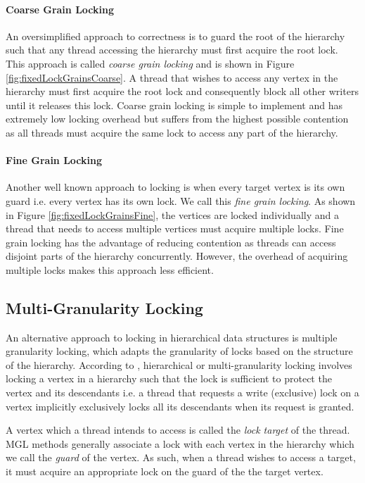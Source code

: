 \paragraph{Coarse Grain Locking}
An oversimplified approach to correctness is to guard the root of the hierarchy such that any thread accessing the hierarchy must first acquire the root lock.
This approach is called \emph{coarse grain locking} and is shown in Figure \ref{fig:fixedLockGrainsCoarse}.
A thread that wishes to access any vertex in the hierarchy must first acquire the root lock and consequently block all other writers until it releases this lock. 
Coarse grain locking is simple to implement and has extremely low locking overhead but suffers from the highest possible contention as all threads must acquire the same lock to access any part of the hierarchy. 


\paragraph{Fine Grain Locking}
Another well known approach to locking is when every target vertex is its own guard i.e. every vertex has its own lock. 
We call this \emph{fine grain locking}.
As shown in Figure \ref{fig:fixedLockGrainsFine}, the vertices are locked individually and a thread that needs to access multiple vertices must acquire multiple locks. 
Fine grain locking has the advantage of reducing contention as threads can access disjoint parts of the hierarchy concurrently. 
However, the overhead of acquiring multiple locks makes this approach less efficient. 


\subsection{Multi-Granularity Locking}
An alternative approach to locking in hierarchical data structures is multiple granularity locking, which adapts the granularity of locks based on the structure of the hierarchy. 
According to \citet{gray1975granularity}, hierarchical or multi-granularity locking involves locking a vertex in a hierarchy such that the lock is sufficient to protect the vertex and its descendants i.e. a thread that requests a write (exclusive) lock on a vertex implicitly exclusively locks all its descendants when its request is granted. 

A vertex which a thread intends to access is called the \emph{lock target} of the thread. 
MGL methods generally associate a lock with each vertex in the hierarchy which we call the \emph{guard} of the vertex. 
As such, when a thread wishes to access a target, it must acquire an appropriate lock on the guard of the the target vertex. 




